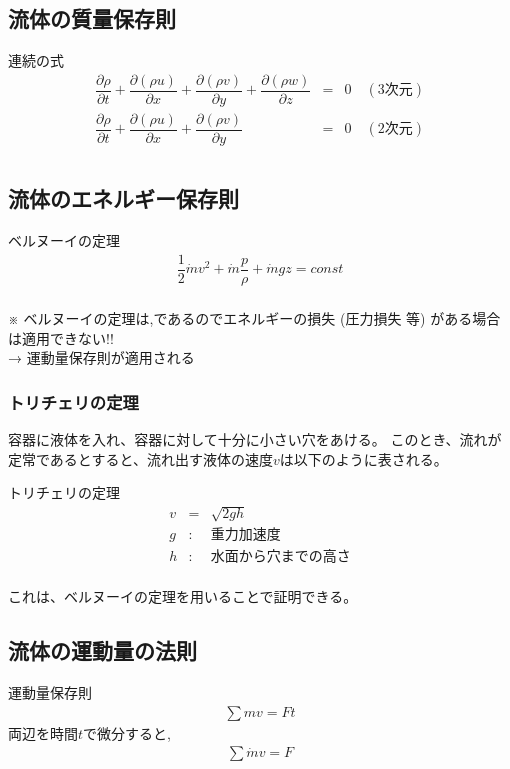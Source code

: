\documentclass[a4paper]{jsarticle}
\begin{document}
\subsection{流体の質量保存則}
\begin{itembox}[l]{連続の式}
    \begin{eqnarray*}
        \dfrac{\partial\rho}{\partial t}+\dfrac{\partial \left(\rho u\right)}{\partial x}+\dfrac{\partial \left(\rho v\right)}{\partial y}+\dfrac{\partial \left(\rho w\right)}{\partial z}&=&0\quad(3次元)\\
        \dfrac{\partial\rho}{\partial t}+\dfrac{\partial \left(\rho u\right)}{\partial x}+\dfrac{\partial \left(\rho v\right)}{\partial y}&=&0\quad(2次元)\\
    \end{eqnarray*}
\end{itembox}
\subsection{流体のエネルギー保存則}
\begin{itembox}[l]{ベルヌーイの定理}
    \begin{eqnarray*}
        \dfrac{1}{2}\dot{m}v^2+\dot{m}\dfrac{p}{\rho}+\dot{m}gz=const\\
    \end{eqnarray*}
\end{itembox}
※ ベルヌーイの定理は,であるのでエネルギーの損失 (圧力損失 等) がある場合は適用できない!!\\
→ 運動量保存則が適用される
\subsubsection{トリチェリの定理}
容器に液体を入れ、容器に対して十分に小さい穴をあける。
このとき、流れが定常であるとすると、流れ出す液体の速度$v$は以下のように表される。
\begin{itembox}[l]{トリチェリの定理}
    \begin{eqnarray*}
        v&=&\sqrt{2gh}\\
        g&:&重力加速度\\
        h&:&水面から穴までの高さ\\
    \end{eqnarray*}
\end{itembox}
これは、ベルヌーイの定理を用いることで証明できる。
\subsection{流体の運動量の法則}
\begin{itembox}[l]{運動量保存則}
    \begin{eqnarray*}
        \displaystyle\sum mv=Ft
    \end{eqnarray*}
    両辺を時間$t$で微分すると,
    \begin{eqnarray*}
        \displaystyle\sum \dot{m}v=F
    \end{eqnarray*}
\end{itembox}
\end{document}

